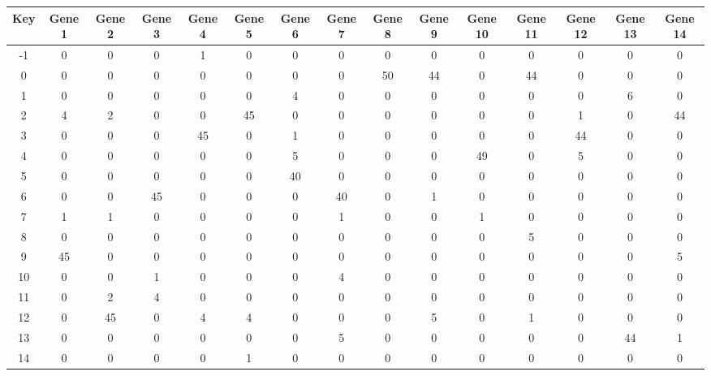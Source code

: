 \begin{tabular}{|c|c|c|c|c|c|c|c|c|c|c|c|c|c|c|}
\hline
Key & Gene 1 & Gene 2 & Gene 3 & Gene 4 & Gene 5 & Gene 6 & Gene 7 & Gene 8 & Gene 9 & Gene 10 & Gene 11 & Gene 12 & Gene 13 & Gene 14 \\
\hline
-1 & 0 & 0 & 0 & 1 & 0 & 0 & 0 & 0 & 0 & 0 & 0 & 0 & 0 & 0 \\
0 & 0 & 0 & 0 & 0 & 0 & 0 & 0 & 50 & 44 & 0 & 44 & 0 & 0 & 0 \\
1 & 0 & 0 & 0 & 0 & 0 & 4 & 0 & 0 & 0 & 0 & 0 & 0 & 6 & 0 \\
2 & 4 & 2 & 0 & 0 & 45 & 0 & 0 & 0 & 0 & 0 & 0 & 1 & 0 & 44 \\
3 & 0 & 0 & 0 & 45 & 0 & 1 & 0 & 0 & 0 & 0 & 0 & 44 & 0 & 0 \\
4 & 0 & 0 & 0 & 0 & 0 & 5 & 0 & 0 & 0 & 49 & 0 & 5 & 0 & 0 \\
5 & 0 & 0 & 0 & 0 & 0 & 40 & 0 & 0 & 0 & 0 & 0 & 0 & 0 & 0 \\
6 & 0 & 0 & 45 & 0 & 0 & 0 & 40 & 0 & 1 & 0 & 0 & 0 & 0 & 0 \\
7 & 1 & 1 & 0 & 0 & 0 & 0 & 1 & 0 & 0 & 1 & 0 & 0 & 0 & 0 \\
8 & 0 & 0 & 0 & 0 & 0 & 0 & 0 & 0 & 0 & 0 & 5 & 0 & 0 & 0 \\
9 & 45 & 0 & 0 & 0 & 0 & 0 & 0 & 0 & 0 & 0 & 0 & 0 & 0 & 5 \\
10 & 0 & 0 & 1 & 0 & 0 & 0 & 4 & 0 & 0 & 0 & 0 & 0 & 0 & 0 \\
11 & 0 & 2 & 4 & 0 & 0 & 0 & 0 & 0 & 0 & 0 & 0 & 0 & 0 & 0 \\
12 & 0 & 45 & 0 & 4 & 4 & 0 & 0 & 0 & 5 & 0 & 1 & 0 & 0 & 0 \\
13 & 0 & 0 & 0 & 0 & 0 & 0 & 5 & 0 & 0 & 0 & 0 & 0 & 44 & 1 \\
14 & 0 & 0 & 0 & 0 & 1 & 0 & 0 & 0 & 0 & 0 & 0 & 0 & 0 & 0 \\
\hline
\end{tabular}